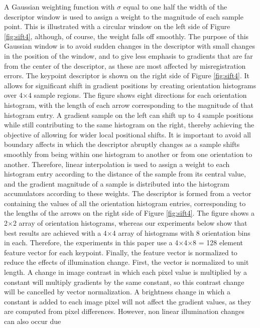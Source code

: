 A Gaussian weighting function with $\sigma$ equal to one half the width of the descriptor
window is used to assign a weight to the magnitude of each sample point. This is illustrated
with a circular window on the left side of Figure \ref{fig:sift4}, although, of course, the weight falls off smoothly. The purpose of this Gaussian window is to avoid sudden changes in the
descriptor with small changes in the position of the window, and to give less emphasis
to gradients that are far from the center of the descriptor, as these are most affected by
misregistration errors.
The keypoint descriptor is shown on the right side of Figure \ref{fig:sift4}. It allows for significant
shift in gradient positions by creating orientation histograms over 4$\times$4 sample regions. The
figure shows eight directions for each orientation histogram, with the length of each arrow
corresponding to the magnitude of that histogram entry. A gradient sample on the left can
shift up to 4 sample positions while still contributing to the same histogram on the right,
thereby achieving the objective of allowing for wider local positional shifts.
It is important to avoid all boundary affects in which the descriptor abruptly changes as
a sample shifts smoothly from being within one histogram to another or from one orientation
to another. Therefore, linear interpolation is used to assign a weight to each histogram
entry according to the distance of the sample from its central value, and the gradient magnitude
of a sample is distributed into the histogram accumulators according to these weights.
The descriptor is formed from a vector containing the values of all the orientation histogram
entries, corresponding to the lengths of the arrows on the right side of Figure \ref{fig:sift4}. The
figure shows a 2$\times$2 array of orientation histograms, whereas our experiments below show
that best results are achieved with a 4$\times$4 array of histograms with 8 orientation bins in each.
Therefore, the experiments in this paper use a 4$\times$4$\times$8 = 128 element feature vector for each
keypoint.
Finally, the feature vector is normalized to reduce the effects of illumination change.
First, the vector is normalized to unit length. A change in image contrast in which each
pixel value is multiplied by a constant will multiply gradients by the same constant, so this
contrast change will be cancelled by vector normalization. A brightness change in which a
constant is added to each image pixel will not affect the gradient values, as they are computed
from pixel differences. However, non linear illumination changes can also occur due
